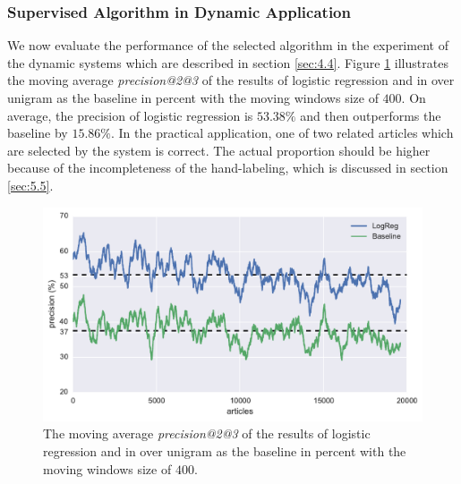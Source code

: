 \subsubsection{Supervised Algorithm in Dynamic Application}

We now evaluate the performance of the selected algorithm in the experiment of the dynamic systems which are described in section \ref{sec:4.4}. Figure \ref{fig:prec_supervised} illustrates the moving average \textit{precision@2@3} of the results of logistic regression and \tfidf{} in \icontent{} over unigram as the baseline in percent with the moving windows size of $400$. On average, the precision of logistic regression is $53.38\%$ and then outperforms the baseline by $15.86\%$. In the practical application, one of two related articles which are selected by the system is correct. The actual proportion should be higher because of the incompleteness of the hand-labeling, which is discussed in section \ref{sec:5.5}.

\begin{figure}[!htb]
    \centering
    \includegraphics[width=\textwidth]{fig/precision_inc_supervised}
    \caption[The moving average \textit{precision@2@3} of the results of logistic regression and \tfidf{} in \icontent{} over unigram as baseline]{The moving average \textit{precision@2@3} of the results of logistic regression and \tfidf{} in \icontent{} over unigram as the baseline in percent with the moving windows size of $400$.}
    \label{fig:prec_supervised}
\end{figure}